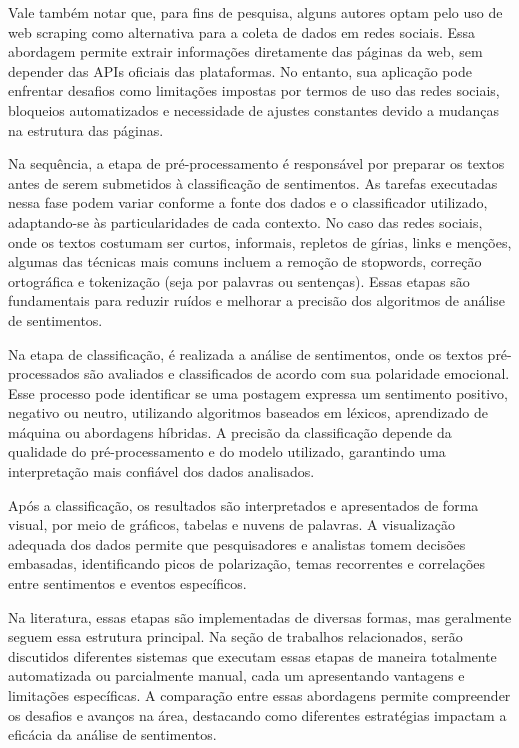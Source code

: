 \documentclass[
	12pt,				%
	oneside,			%
	a4paper,			%
	english,			%
	french,				%
	spanish,			%
	brazil				%
	]{abntex2}
\begin{document}
Vale também notar que, para fins de pesquisa, alguns autores optam pelo
uso de web scraping como alternativa para a coleta de dados em redes
sociais. Essa abordagem permite extrair informações diretamente das
páginas da web, sem depender das APIs oficiais das plataformas. No
entanto, sua aplicação pode enfrentar desafios como limitações impostas
por termos de uso das redes sociais, bloqueios automatizados e
necessidade de ajustes constantes devido a mudanças na estrutura das
páginas.

Na sequência, a etapa de pré-processamento é responsável por preparar os
textos antes de serem submetidos à classificação de sentimentos. As
tarefas executadas nessa fase podem variar conforme a fonte dos dados e
o classificador utilizado, adaptando-se às particularidades de cada
contexto. No caso das redes sociais, onde os textos costumam ser curtos,
informais, repletos de gírias, links e menções, algumas das técnicas
mais comuns incluem a remoção de stopwords, correção ortográfica e
tokenização (seja por palavras ou sentenças). Essas etapas são
fundamentais para reduzir ruídos e melhorar a precisão dos algoritmos de
análise de sentimentos.

Na etapa de classificação, é realizada a análise de sentimentos, onde os
textos pré-processados são avaliados e classificados de acordo com sua
polaridade emocional. Esse processo pode identificar se uma postagem
expressa um sentimento positivo, negativo ou neutro, utilizando
algoritmos baseados em léxicos, aprendizado de máquina ou abordagens
híbridas. A precisão da classificação depende da qualidade do
pré-processamento e do modelo utilizado, garantindo uma interpretação
mais confiável dos dados analisados.

Após a classificação, os resultados são interpretados e apresentados de
forma visual, por meio de gráficos, tabelas e nuvens de palavras. A
visualização adequada dos dados permite que pesquisadores e analistas
tomem decisões embasadas, identificando picos de polarização, temas
recorrentes e correlações entre sentimentos e eventos específicos.

Na literatura, essas etapas são implementadas de diversas formas, mas
geralmente seguem essa estrutura principal. Na seção de trabalhos
relacionados, serão discutidos diferentes sistemas que executam essas
etapas de maneira totalmente automatizada ou parcialmente manual, cada
um apresentando vantagens e limitações específicas. A comparação entre
essas abordagens permite compreender os desafios e avanços na área,
destacando como diferentes estratégias impactam a eficácia da análise de
sentimentos.
\end{document}
